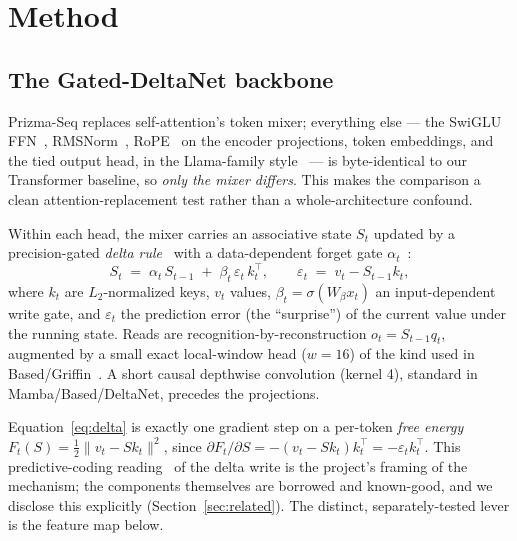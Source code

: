 \documentclass[11pt]{article}
\begin{document}
\section{Method}
\label{sec:method}

\subsection{The Gated-DeltaNet backbone}
Prizma-Seq replaces self-attention's token mixer; everything else --- the SwiGLU
FFN~\cite{shazeer2020glu}, RMSNorm~\cite{zhang2019rmsnorm}, RoPE~\cite{su2021roformer} on the
encoder projections, token embeddings, and the tied output head, in the
Llama-family style~\cite{touvron2023llama} --- is byte-identical to our Transformer baseline, so
\emph{only the mixer differs}. This makes the comparison a clean attention-replacement test rather
than a whole-architecture confound.

Within each head, the mixer carries an associative state $S_t$ updated by a precision-gated
\emph{delta rule}~\cite{yang2024deltanet,schlag2021linear} with a data-dependent forget gate
$\alpha_t$~\cite{yang2024gateddeltanet,gu2024mamba}:
\begin{equation}
S_t \;=\; \alpha_t\, S_{t-1} \;+\; \beta_t\,\varepsilon_t\, k_t^{\top},
\qquad
\varepsilon_t \;=\; v_t - S_{t-1} k_t,
\label{eq:delta}
\end{equation}
where $k_t$ are $L_2$-normalized keys, $v_t$ values, $\beta_t=\sigma(W_\beta x_t)$ an
input-dependent write gate, and $\varepsilon_t$ the prediction error (the ``surprise'') of the
current value under the running state. Reads are recognition-by-reconstruction
$o_t = S_{t-1} q_t$, augmented by a small exact local-window head ($w{=}16$) of the kind used in
Based/Griffin~\cite{arora2024based,de2024griffin}. A short causal depthwise convolution (kernel 4),
standard in Mamba/Based/DeltaNet, precedes the projections.

Equation~\eqref{eq:delta} is exactly one gradient step on a per-token \emph{free energy}
$F_t(S)=\tfrac12\lVert v_t - S k_t\rVert^2$, since
$\partial F_t/\partial S = -(v_t - S k_t)k_t^{\top} = -\varepsilon_t k_t^{\top}$. This
predictive-coding reading~\cite{rao1999predictive,friston2010free} of the delta write is the
project's framing of the mechanism; the components themselves are borrowed and known-good, and we
disclose this explicitly (Section~\ref{sec:related}). The distinct, separately-tested lever is the
feature map below.
\end{document}
